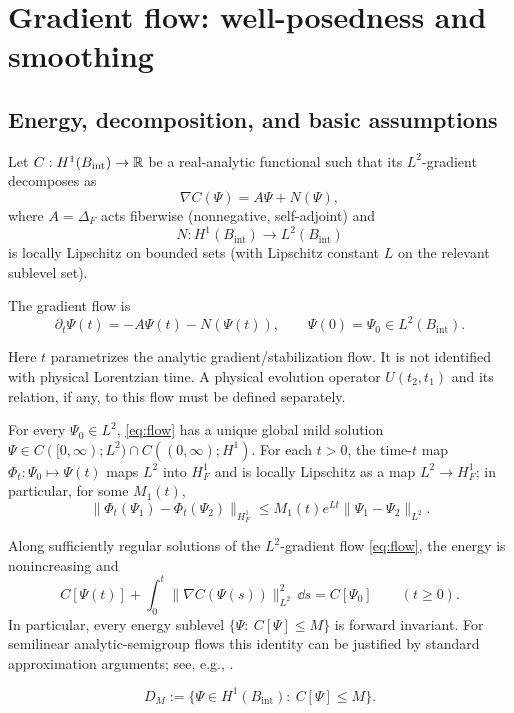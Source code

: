 \documentclass[11pt]{article}
\providecommand{\Bint}{B_{\mathrm{int}}}
\providecommand{\Aop}{A}
\begin{document}
\section{Gradient flow: well-posedness and smoothing}

\subsection{Energy, decomposition, and basic assumptions}

Let $C:H^1(\Bint)\to \bbR$ be a real-analytic functional such that its $L^2$-gradient decomposes as
\[
\nabla C(\Psi) = \Aop\Psi + N(\Psi),
\]
where $\Aop=\Delta_F$ acts fiberwise (nonnegative, self-adjoint) and
\[
N: H^1(\Bint)\to L^2(\Bint)
\]
is locally Lipschitz on bounded sets (with Lipschitz constant $L$ on the relevant sublevel set).

The gradient flow is
\begin{equation}\label{eq:flow}
\partial_t\Psi(t) = -\Aop\Psi(t) - N(\Psi(t)),\qquad \Psi(0)=\Psi_0\in L^2(\Bint).
\end{equation}

\begin{remark}
Here $t$ parametrizes the analytic gradient/stabilization flow. It is not
identified with physical Lorentzian time. A physical evolution operator
$U(t_2,t_1)$ and its relation, if any, to this flow must be defined separately.
\end{remark}

\begin{assumption}\label{ass:lwp}
For every $\Psi_0\in L^2$, \eqref{eq:flow} has a unique global mild solution
$\Psi\in C([0,\infty);L^2)\cap C((0,\infty);H^1)$.
For each $t>0$, the time-$t$ map $\Phi_t:\Psi_0\mapsto \Psi(t)$ maps $L^2$ into $H^1_F$
and is locally Lipschitz as a map $L^2\to H^1_F$; in particular, for some $M_1(t)$,
\[
\|\Phi_t(\Psi_1)-\Phi_t(\Psi_2)\|_{H^1_F}
\le M_1(t)e^{Lt}\|\Psi_1-\Psi_2\|_{L^2}.
\]
\end{assumption}

\begin{proposition}\label{prop:energydec}
Along sufficiently regular solutions of the $L^2$-gradient flow \eqref{eq:flow}, the energy is nonincreasing and
\[
C[\Psi(t)] + \int_{0}^{t}\|\nabla C(\Psi(s))\|_{L^2}^{2}\,\dd s = C[\Psi_0]\qquad (t\ge 0).
\]
In particular, every energy sublevel $\{\Psi:\ C[\Psi]\le M\}$ is forward invariant.
For semilinear analytic-semigroup flows this identity can be justified by standard approximation arguments; see, e.g., \cite{Amann1995,Henry1981}.
\end{proposition}
\newcommand{\DM}{D_M}
\[
\DM := \{\Psi\in H^1(\Bint):\ C[\Psi]\le M\}.
\]
\end{document}
